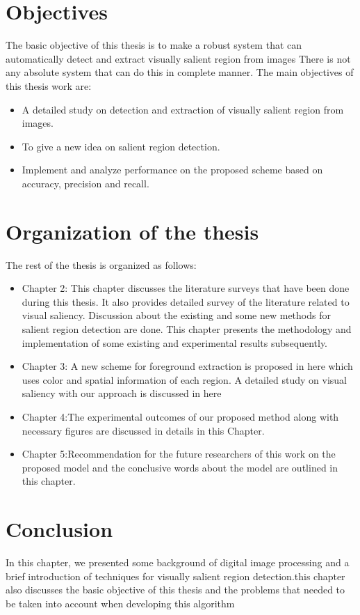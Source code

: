 \section{Objectives}
The basic objective of this thesis is to make a robust system that can automatically detect and extract visually salient region from images
There is not any absolute system that can do this in complete manner. The main objectives of this thesis work are:
\begin{itemize}
  \item A detailed study on detection and extraction of visually salient region from images.
  \item To give a new idea on salient region detection.
  \item Implement and analyze performance on the proposed scheme based on accuracy, precision and recall.
\end{itemize}


 
\section{Organization of the thesis}
The rest of the thesis is organized as follows:
\begin{itemize}
  \item Chapter 2: This chapter discusses the literature surveys that have been done during this thesis. It also provides detailed survey of the literature related to visual saliency. Discussion about the existing and some new methods for salient region detection are done. This chapter presents the methodology and implementation of some existing and experimental results subsequently.
  \item Chapter 3: A new scheme for foreground extraction is proposed in here which uses color and spatial information of each region. A detailed study on visual saliency with our approach is discussed in here
  
  \item Chapter 4:The experimental outcomes of our proposed method along with necessary figures are discussed in details in this Chapter.
  \item Chapter 5:Recommendation for the future researchers of this work on the proposed model and the conclusive words about the model are outlined in this chapter.
  
\end{itemize}


 

  
\section{Conclusion}
In this chapter, we presented some background of digital image processing and a brief introduction of techniques for visually salient region detection.this chapter also discusses the basic objective of this thesis and the problems that needed to be taken into account when developing this algorithm